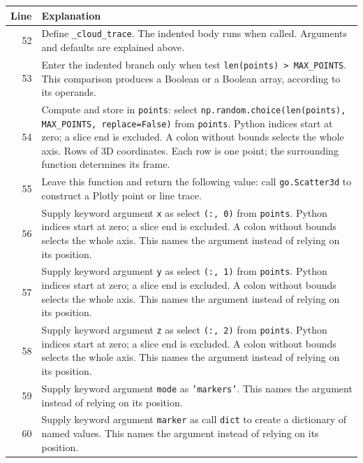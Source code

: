 \documentclass[11pt,a4paper]{book}
\begin{document}
\begin{longtable}{r p{}}

\textbf{Line} & \textbf{Explanation} \\ \hline \endhead

52 & Define \texttt{\_cloud\_trace}. The indented body runs when called. Arguments and defaults are explained above. \\

53 & Enter the indented branch only when test \texttt{len(points) > MAX\_POINTS}. This comparison produces a Boolean or a Boolean array, according to its operands. \\

54 & Compute and store in \texttt{points}: select \texttt{np.random.choice(len(points), MAX\_POINTS, replace=False)} from \texttt{points}. Python indices start at zero; a slice end is excluded. A colon without bounds selects the whole axis. Rows of 3D coordinates. Each row is one point; the surrounding function determines its frame. \\

55 & Leave this function and return the following value: call \texttt{go.Scatter3d} to construct a Plotly point or line trace. \\

56 & Supply keyword argument \texttt{x} as select \texttt{(:, 0)} from \texttt{points}. Python indices start at zero; a slice end is excluded. A colon without bounds selects the whole axis. This names the argument instead of relying on its position. \\

57 & Supply keyword argument \texttt{y} as select \texttt{(:, 1)} from \texttt{points}. Python indices start at zero; a slice end is excluded. A colon without bounds selects the whole axis. This names the argument instead of relying on its position. \\

58 & Supply keyword argument \texttt{z} as select \texttt{(:, 2)} from \texttt{points}. Python indices start at zero; a slice end is excluded. A colon without bounds selects the whole axis. This names the argument instead of relying on its position. \\

59 & Supply keyword argument \texttt{mode} as \texttt{'markers'}. This names the argument instead of relying on its position. \\

60 & Supply keyword argument \texttt{marker} as call \texttt{dict} to create a dictionary of named values. This names the argument instead of relying on its position. \\


\end{longtable}
\end{document}
